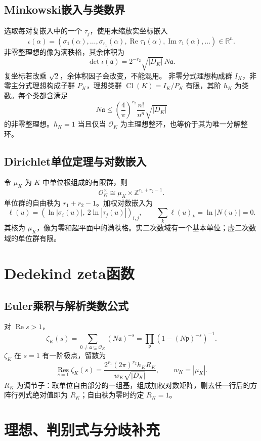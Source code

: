 \documentclass[../main.tex]{subfiles}
\begin{document}
\subsection{Minkowski嵌入与类数界}
选取每对复嵌入中的一个 $\tau_j$，使用未缩放实坐标嵌入
\[
\iota(\alpha)=(\sigma_1(\alpha),\ldots,\sigma_{r_1}(\alpha),
\operatorname{Re}\tau_1(\alpha),\operatorname{Im}\tau_1(\alpha),\ldots)\in\mathbb R^n.
\]
非零整理想的像为满秩格，其余体积为
\[
\det\iota(\mathfrak a)=2^{-r_2}\sqrt{|D_K|}\,N\mathfrak a.
\]
复坐标若改乘 $\sqrt2$，余体积因子会改变，不能混用。
非零分式理想构成群 $I_K$，非零主分式理想构成子群 $P_K$，理想类群 $\operatorname{Cl}(K)=I_K/P_K$ 有限，其阶 $h_K$ 为类数。每个类都含满足
\[
N\mathfrak a\le\left(\frac4\pi\right)^{r_2}\frac{n!}{n^n}\sqrt{|D_K|}
\]
的非零整理想。$h_K=1$ 当且仅当 $\mathcal O_K$ 为主理想整环，也等价于其为唯一分解整环。
\subsection{Dirichlet单位定理与对数嵌入}
令 $\mu_K$ 为 $K$ 中单位根组成的有限群，则
\[
\mathcal O_K^\times\cong\mu_K\times\mathbb Z^{r_1+r_2-1}.
\]
单位群的自由秩为 $r_1+r_2-1$。加权对数嵌入为
\[
\ell(u)=(\ln|\sigma_i(u)|,\ 2\ln|\tau_j(u)|)_{i,j},\qquad
\sum_k\ell(u)_k=\ln|N(u)|=0.
\]
其核为 $\mu_K$，像为零和超平面中的满秩格。实二次数域有一个基本单位；虚二次数域的单位群有限。
\section{Dedekind zeta函数}
\subsection{Euler乘积与解析类数公式}
对 $\operatorname{Re}s>1$，
\[
\zeta_K(s)=\sum_{0\ne\mathfrak a\subseteq\mathcal O_K}(N\mathfrak a)^{-s}
=\prod_{\mathfrak p}(1-(N\mathfrak p)^{-s})^{-1}.
\]
$\zeta_K$ 在 $s=1$ 有一阶极点，留数为
\[
\operatorname*{Res}_{s=1}\zeta_K(s)
=\frac{2^{r_1}(2\pi)^{r_2}h_KR_K}{w_K\sqrt{|D_K|}},\qquad w_K=|\mu_K|.
\]
$R_K$ 为调节子：取单位自由部分的一组基，组成加权对数矩阵，删去任一行后的方阵行列式绝对值即为 $R_K$；自由秩为零时约定 $R_K=1$。
\section{理想、判别式与分歧补充}
\end{document}
